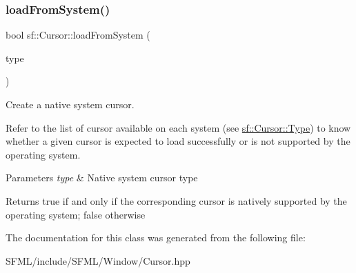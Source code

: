 \subsubsection{\texorpdfstring{loadFromSystem()}{loadFromSystem()}}
{\footnotesize\ttfamily bool sf\+::\+Cursor\+::load\+From\+System (\begin{DoxyParamCaption}\item[{\mbox{\hyperlink{classsf_1_1_cursor_ab9ab152aec1f8a4955e34ccae08f930a}{Type}}}]{type }\end{DoxyParamCaption})}



Create a native system cursor. 

Refer to the list of cursor available on each system (see \mbox{\hyperlink{classsf_1_1_cursor_ab9ab152aec1f8a4955e34ccae08f930a}{sf\+::\+Cursor\+::\+Type}}) to know whether a given cursor is expected to load successfully or is not supported by the operating system.


\begin{DoxyParams}{Parameters}
{\em type} & Native system cursor type \\
\hline
\end{DoxyParams}
\begin{DoxyReturn}{Returns}
true if and only if the corresponding cursor is natively supported by the operating system; false otherwise \begin{DoxyVerb}\end{DoxyVerb}
 
\end{DoxyReturn}


The documentation for this class was generated from the following file\+:\begin{DoxyCompactItemize}
\item 
S\+F\+M\+L/include/\+S\+F\+M\+L/\+Window/Cursor.\+hpp\end{DoxyCompactItemize}
